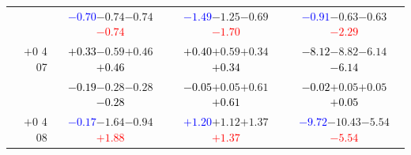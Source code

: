 \documentclass[compress]{beamer}
\begin{document}
\begin{frame}
\begin{tabular}{r | c | c | c}
          & \textcolor{blue}{$-0.70$}\hspace{0.1 cm}$-0.74$\hspace{0.1 cm}$-0.74$\hspace{0.1 cm}\textcolor{red}{$-0.74$} & \textcolor{blue}{$-1.49$}\hspace{0.1 cm}$-1.25$\hspace{0.1 cm}$-0.69$\hspace{0.1 cm}\textcolor{red}{$-1.70$} & \textcolor{blue}{$-0.91$}\hspace{0.1 cm}$-0.63$\hspace{0.1 cm}$-0.63$\hspace{0.1 cm}\textcolor{red}{$-2.29$} \\
$+$0 4 07 & \textcolor{black}{$+0.33$}\hspace{0.1 cm}$-0.59$\hspace{0.1 cm}$+0.46$\hspace{0.1 cm}\textcolor{black}{$+0.46$} & \textcolor{black}{$+0.40$}\hspace{0.1 cm}$+0.59$\hspace{0.1 cm}$+0.34$\hspace{0.1 cm}\textcolor{black}{$+0.34$} & \textcolor{black}{$-8.12$}\hspace{0.1 cm}$-8.82$\hspace{0.1 cm}$-6.14$\hspace{0.1 cm}\textcolor{black}{$-6.14$} \\
          & \textcolor{black}{$-0.19$}\hspace{0.1 cm}$-0.28$\hspace{0.1 cm}$-0.28$\hspace{0.1 cm}\textcolor{black}{$-0.28$} & \textcolor{black}{$-0.05$}\hspace{0.1 cm}$+0.05$\hspace{0.1 cm}$+0.61$\hspace{0.1 cm}\textcolor{black}{$+0.61$} & \textcolor{black}{$-0.02$}\hspace{0.1 cm}$+0.05$\hspace{0.1 cm}$+0.05$\hspace{0.1 cm}\textcolor{black}{$+0.05$} \\
$+$0 4 08 & \textcolor{blue}{$-0.17$}\hspace{0.1 cm}$-1.64$\hspace{0.1 cm}$-0.94$\hspace{0.1 cm}\textcolor{red}{$+1.88$} & \textcolor{blue}{$+1.20$}\hspace{0.1 cm}$+1.12$\hspace{0.1 cm}$+1.37$\hspace{0.1 cm}\textcolor{red}{$+1.37$} & \textcolor{blue}{$-9.72$}\hspace{0.1 cm}$-10.43$\hspace{0.1 cm}$-5.54$\hspace{0.1 cm}\textcolor{red}{$-5.54$} \\

\end{tabular}
\end{frame}
\end{document}
